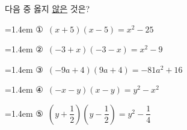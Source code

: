 다음 중 옳지 \underline{않은} 것은?
\par\medskip\par\noindent\hangindent=1.4em {\small ①}\ $(x+5)(x-5)=x^2-25$\par\noindent\hangindent=1.4em {\small ②}\ $(-3+x)(-3-x)=x^2-9$\par\noindent\hangindent=1.4em {\small ③}\ $(-9a+4)(9a+4)=-81a^2+16$\par\noindent\hangindent=1.4em {\small ④}\ $(-x-y)(x-y)=y^2-x^2$\par\noindent\hangindent=1.4em {\small ⑤}\ $\left(y+\dfrac{1}{2}\right)\left(y-\dfrac{1}{2}\right)=y^2-\dfrac{1}{4}$\par\medskip
